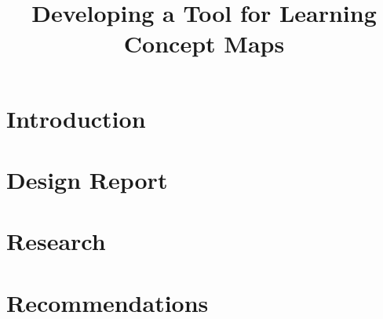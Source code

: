 \documentclass[twoside]{report} %
\let\Oldpart\part
\newcommand{\parttitle}{}
\renewcommand{\part}[1]{\Oldpart{#1}\renewcommand{\parttitle}{#1}}
\begin{document}

\title{Developing a Tool for Learning Concept Maps}

\maketitle
\tableofcontents
\thispagestyle{fancy}


%
%


\part{Introduction}

\part{Design Report}

\part{Research}

\part{Recommendations}
\end{document}
